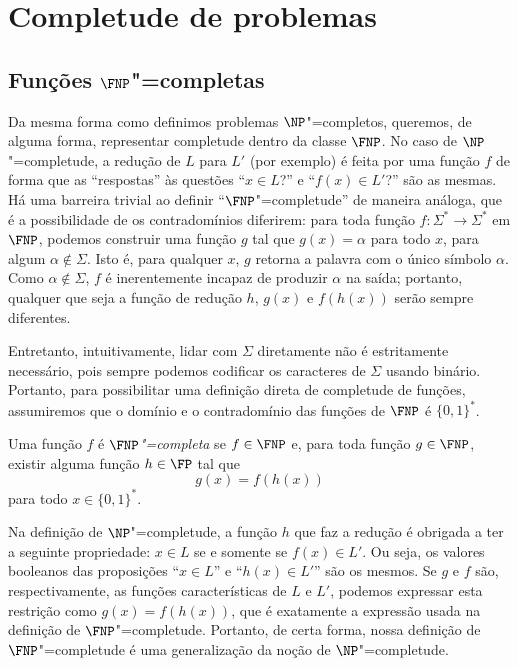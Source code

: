 \section{Completude de problemas}

\subsection{Funções $\FNP$"=completas}

Da mesma forma como definimos problemas $\NP$"=completos,
queremos, de alguma forma,
representar completude dentro da classe $\FNP$.
No caso de $\NP$"=completude,
a redução de $L$ para $L'$ (por exemplo)
é feita por uma função $f$ de forma que
as ``respostas'' às questões ``$x \in L$?'' e ``$f(x) \in L'$?'' são as mesmas.
Há uma barreira trivial ao definir ``$\FNP$"=completude'' de maneira análoga,
que é a possibilidade de os contradomínios diferirem:
para toda função $f: \Sigma^* \to \Sigma^*$ em $\FNP$,
podemos construir uma função $g$ tal que $g(x) = \alpha$ para todo $x$,
para algum $\alpha \notin \Sigma$.
Isto é, para qualquer $x$, $g$ retorna a palavra com o único símbolo $\alpha$.
Como $\alpha \notin \Sigma$,
$f$ é inerentemente incapaz de produzir $\alpha$ na saída;
portanto, qualquer que seja a função de redução $h$,
$g(x)$ e $f(h(x))$ serão sempre diferentes.

Entretanto, intuitivamente,
lidar com $\Sigma$ diretamente não é estritamente necessário,
pois sempre podemos codificar os caracteres de $\Sigma$ usando binário.
Portanto,
para possibilitar uma definição direta de completude de funções,
assumiremos que o domínio e o contradomínio das funções de $\FNP$
é $\{0, 1\}^*$.

\begin{definition}
    Uma função $f$ é \emph{$\FNP$"=completa}
    se $f \in \FNP$ e,
    para toda função $g \in \FNP$,
    existir alguma função $h \in \FP$ tal que
    \begin{equation*}
        g(x) = f(h(x))
    \end{equation*}
    para todo $x \in \{0, 1\}^*$.
\end{definition}

Na definição de $\NP$"=completude,
a função $h$ que faz a redução é obrigada a ter a seguinte propriedade:
$x \in L$ se e somente se $f(x) \in L'$.
Ou seja, os valores booleanos das proposições
``$x \in L$'' e ``$h(x) \in L'$'' são os mesmos.
Se $g$ e $f$ são, respectivamente,
as funções características de $L$ e $L'$,
podemos expressar esta restrição como
$g(x) = f(h(x))$,
que é exatamente a expressão usada na definição de $\FNP$"=completude.
Portanto, de certa forma,
nossa definição de $\FNP$"=completude
é uma generalização da noção de $\NP$"=completude.

